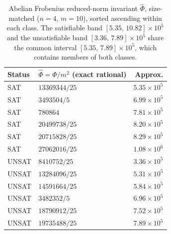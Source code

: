 \documentclass[pdflatex,sn-mathphys-num]{sn-jnl}
\theoremstyle{thmstyleone}%
\theoremstyle{thmstyletwo}%
\theoremstyle{thmstylethree}%
\begin{document}
\begin{table}[t]
\caption{Abelian Frobenius reduced-norm invariant $\widehat{\Phi}$,
size-matched ($n=4$, $m=10$), sorted ascending within each class. The
satisfiable band $[5.35,\,10.82]\times10^{5}$ and the unsatisfiable band
$[3.36,\,7.89]\times10^{5}$ share the common interval
$[5.35,\,7.89]\times10^{5}$, which contains members of both classes.}
\label{tab:frob}
\centering
\small
\begin{tabular}{@{}l l r@{}}
\toprule
Status & $\widehat{\Phi}=\Phi/m^{2}$ (exact rational) & Approx.\\
\midrule
SAT   & $13369344/25$   & $5.35\times10^{5}$\\
SAT   & $3493504/5$     & $6.99\times10^{5}$\\
SAT   & $780864$        & $7.81\times10^{5}$\\
SAT   & $20499738/25$   & $8.20\times10^{5}$\\
SAT   & $20715828/25$   & $8.29\times10^{5}$\\
SAT   & $27062016/25$   & $1.08\times10^{6}$\\
\midrule
UNSAT & $8410752/25$    & $3.36\times10^{5}$\\
UNSAT & $13284096/25$   & $5.31\times10^{5}$\\
UNSAT & $14591664/25$   & $5.84\times10^{5}$\\
UNSAT & $3482352/5$     & $6.96\times10^{5}$\\
UNSAT & $18790912/25$   & $7.52\times10^{5}$\\
UNSAT & $19735488/25$   & $7.89\times10^{5}$\\
\bottomrule
\end{tabular}
\end{table}
\end{document}
